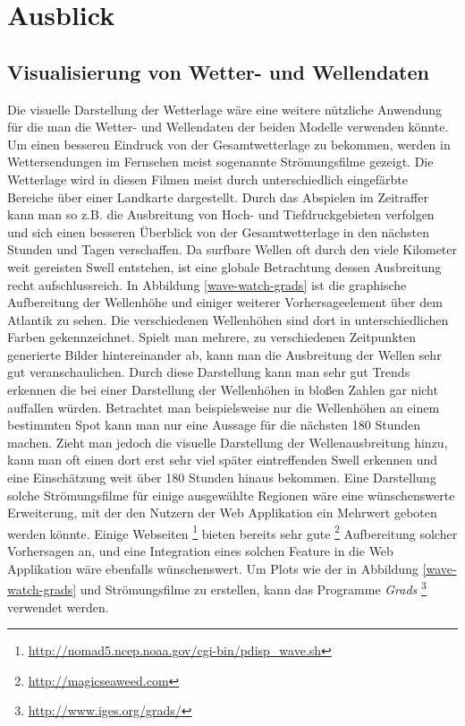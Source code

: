 \chapter{Ausblick}

\section{Visualisierung von Wetter- und Wellendaten}
Die visuelle Darstellung der Wetterlage wäre eine weitere nützliche
Anwendung für die man die Wetter- und Wellendaten der beiden Modelle
verwenden könnte. Um einen besseren Eindruck von der Gesamtwetterlage
zu bekommen, werden in Wettersendungen im Fernsehen meist sogenannte
Strömungsfilme gezeigt. Die Wetterlage wird in diesen Filmen meist
durch unterschiedlich eingefärbte Bereiche über einer Landkarte
dargestellt. Durch das Abspielen im Zeitraffer kann man so z.B. die
Ausbreitung von Hoch- und Tiefdruckgebieten verfolgen und sich einen
besseren Überblick von der Gesamtwetterlage in den nächsten Stunden
und Tagen verschaffen. Da surfbare Wellen oft durch den viele
Kilometer weit gereisten Swell entstehen, ist eine globale Betrachtung
dessen Ausbreitung recht aufschlussreich. In Abbildung
\ref{wave-watch-grads} ist die graphische Aufbereitung der Wellenhöhe
und einiger weiterer Vorhersageelement über dem Atlantik zu sehen. Die
verschiedenen Wellenhöhen sind dort in unterschiedlichen Farben
gekennzeichnet. Spielt man mehrere, zu verschiedenen Zeitpunkten
generierte Bilder hintereinander ab, kann man die Ausbreitung der
Wellen sehr gut veranschaulichen. Durch diese Darstellung kann man
sehr gut Trends erkennen die bei einer Darstellung der Wellenhöhen in
bloßen Zahlen gar nicht auffallen würden. Betrachtet man
beispielsweise nur die Wellenhöhen an einem bestimmten Spot kann man
nur eine Aussage für die nächsten 180 Stunden machen. Zieht man jedoch
die visuelle Darstellung der Wellenausbreitung hinzu, kann man oft
einen dort erst sehr viel später eintreffenden Swell erkennen und eine
Einschätzung weit über 180 Stunden hinaus bekommen. Eine Darstellung
solche Strömungsfilme für einige ausgewählte Regionen wäre eine
wünschenswerte Erweiterung, mit der den Nutzern der Web Applikation
ein Mehrwert geboten werden könnte. Einige Webseiten
\footnote{\url{http://nomad5.ncep.noaa.gov/cgi-bin/pdisp_wave.sh}}
bieten bereits sehr gute \footnote{\url{http://magicseaweed.com}}
Aufbereitung solcher Vorhersagen an, und eine Integration eines
solchen Feature in die Web Applikation wäre ebenfalls
wünschenswert. Um Plots wie der in Abbildung \ref{wave-watch-grads}
und Strömungsfilme zu erstellen, kann das Programme \textit{Grads}
\footnote{\url{http://www.iges.org/grads/}} verwendet werden.

